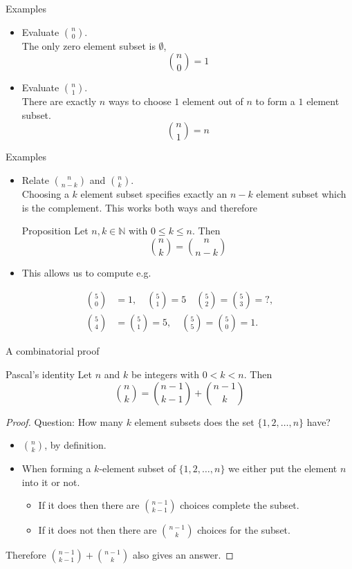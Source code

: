 \documentclass{beamer}
\def\bl[#1]#2{\begin{block}{#1}#2\end{block}}
\def\itemb{\begin{itemize}}
\def\iteme{\end{itemize}}
\begin{document}
\begin{frame}{Examples}
\itemb
\item Evaluate $\binom{n}{0}$.\\

The only zero element subset is $\emptyset$,
\[
\binom{n}{0}=1
\]
\item Evaluate $\binom{n}{1}$.\\

There are exactly $n$ ways to choose $1$ element out of $n$ to form a $1$ element subset.
\[
\binom{n}{1}=n
\]
\iteme
\end{frame}


\begin{frame}{Examples}
\itemb
\item Relate $\binom{n}{n-k}$ and $\binom{n}{k}$.\\

Choosing a $k$ element subset specifies exactly an $n-k$ element subset which is the complement. This works both ways and therefore
\bl[Proposition]{
Let $n,k\in\mathbb{N}$ with $0\leq k\leq n$. Then
\[
\binom{n}{k}=\binom{n}{n-k}
\]
}
\item This allows us to compute e.g.

\iteme
\begin{align*}
\binom{5}{0}&=1,\quad\binom{5}{1}=5\quad\binom{5}{2}=\binom{5}{3}=?,\\
\binom{5}{4}&=\binom{5}{1}=5,\quad\binom{5}{5}=\binom{5}{0}=1.
\end{align*}
\end{frame}

\begin{frame}{A combinatorial proof}
\bl[Pascal's identity]{
Let $n$ and $k$ be integers with $0<k<n$. Then
\vspace{-0.2cm}
\[
\binom{n}{k}=\binom{n-1}{k-1}+\binom{n-1}{k}
\]}
\begin{proof}
Question: How many $k$ element subsets does the set $\{1,2,\dots,n\}$ have?
\itemb 
\item $\binom{n}{k}$, by definition.
\item When forming a $k$-element subset of $\{1,2,\dots, n\}$ we either put the element $n$ into it or not.
\itemb
\item If it does then there are $\binom{n-1}{k-1}$ choices complete the subset.
\item If it does not then there are $\binom{n-1}{k}$ choices for the subset.
\iteme
\iteme
Therefore $\binom{n-1}{k-1}+\binom{n-1}{k}$ also gives an answer.
\end{proof}
\end{frame}
\end{document}
